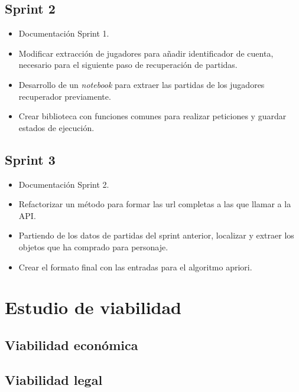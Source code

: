 \subsection{Sprint 2}

\begin{itemize}
    \item Documentación Sprint 1.
    \item Modificar extracción de jugadores para añadir identificador de cuenta, necesario para el siguiente paso de recuperación de partidas.
    \item Desarrollo de un \textit{notebook} para extraer las partidas de los jugadores recuperador previamente.
    \item Crear biblioteca con funciones comunes para realizar peticiones y guardar estados de ejecución.
\end{itemize}

\subsection{Sprint 3}

\begin{itemize}
    \item Documentación Sprint 2.
    \item Refactorizar un método para formar las url completas a las que llamar a la API.
    \item Partiendo de los datos de partidas del sprint anterior, localizar y extraer los objetos que ha comprado para personaje.
    \item Crear el formato final con las entradas para el algoritmo apriori.
\end{itemize}

\section{Estudio de viabilidad}

\subsection{Viabilidad económica}

\subsection{Viabilidad legal}



